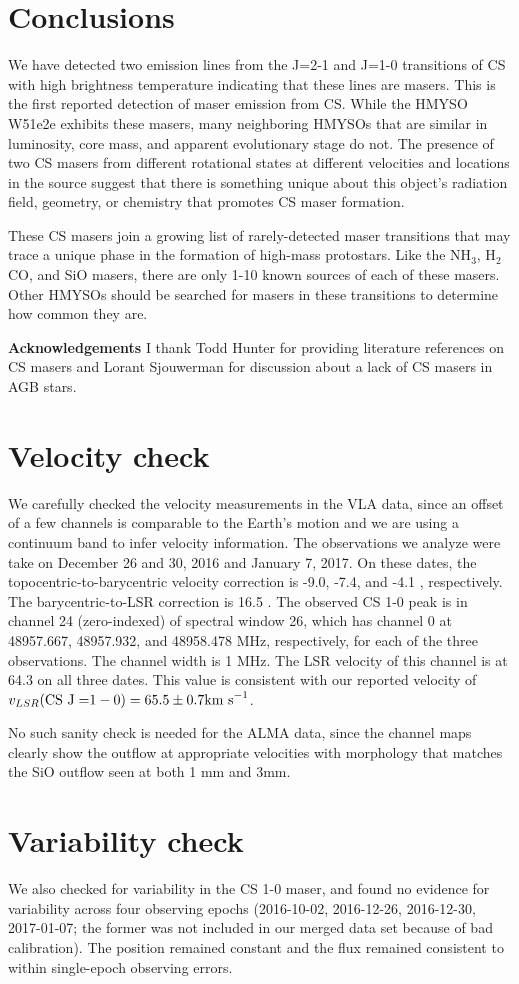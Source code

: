 \documentclass[twocolumn]{aastex62}
\begin{document}
\section{Conclusions}
We have detected two emission lines from the J=2-1 and J=1-0 transitions of CS
with high brightness temperature indicating that these lines are masers.
This is the first reported detection of maser emission from CS.
While the HMYSO W51e2e exhibits these masers, many neighboring HMYSOs that
are similar in luminosity, core mass, and apparent evolutionary stage
do not.  The presence of two CS masers from different rotational states
at different velocities and locations in the source suggest that there is something
unique about this object's radiation field, geometry, or chemistry that
promotes CS maser formation.

These CS masers join a growing list of rarely-detected maser transitions
that may trace a unique phase in the formation of high-mass protostars.
Like the NH$_3$, H$_2$CO, and SiO masers, there are only 1-10 known sources of
each of these masers.  Other HMYSOs should be searched for masers in these
transitions to determine how common they are.

\textbf{Acknowledgements}
I thank Todd Hunter for providing literature references on CS masers and Lorant
Sjouwerman for discussion about a lack of CS masers in AGB stars.

\appendix
\section{Velocity check}
We carefully checked the velocity measurements in the VLA data, since an offset
of a few channels is comparable to the Earth's motion and we are using a
continuum band to infer velocity information.  The observations we analyze were
take on December 26 and 30, 2016 and January 7, 2017.  On these dates, the
topocentric-to-barycentric velocity correction is -9.0, -7.4, and -4.1 \kms,
respectively.  The barycentric-to-LSR correction is 16.5 \kms.  The observed CS
1-0 peak is in channel 24 (zero-indexed) of spectral window 26, which has
channel 0 at  48957.667, 48957.932, and 48958.478 MHz, respectively, for each
of the three observations.  The channel width is 1 MHz.  The LSR velocity of
this channel is at 64.3 \kms on all three dates.  This value is consistent with
our reported velocity of $v_{LSR}(\mathrm{CS~J=}1-0) = 65.5 \pm 0.7 \textrm{km~s}^{-1}$.

No such sanity check is needed for the ALMA data, since the channel maps clearly
show the outflow at appropriate velocities with morphology that matches the SiO
outflow seen at both 1 mm and 3mm.

\section{Variability check}
We also checked for variability in the CS 1-0 maser, and found no evidence for variability
across four observing epochs (2016-10-02, 2016-12-26, 2016-12-30, 2017-01-07; the
former was not included in our merged data set because of bad calibration).
The position remained constant and the flux remained consistent to within single-epoch
observing errors.


\end{document}
